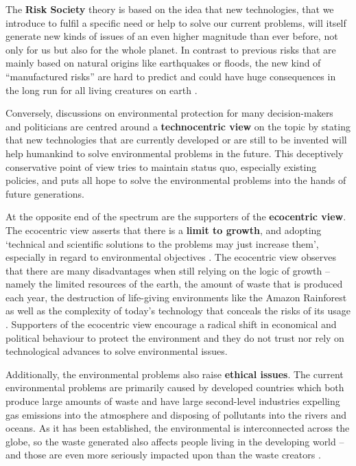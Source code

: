 The \textbf{Risk Society} theory is based on the idea that new technologies, that we introduce to fulfil a specific need or help to solve our current problems, will itself generate new kinds of issues of an even higher magnitude than ever before, not only for us but also for the whole planet. In contrast to previous risks that are mainly based on natural origins like earthquakes or floods, the new kind of ``manufactured risks'' are hard to predict and could have huge consequences in the long run for all living creatures on earth \citep[pg. 53]{Plummer11}.\par\vspace{0.2cm}

Conversely, discussions on environmental protection for many decision-makers and politicians are centred around a \textbf{technocentric view} on the topic by stating that new technologies that are currently developed or are still to be invented will help humankind to solve environmental problems in the future. This deceptively conservative point of view tries to maintain status quo, especially existing policies, and puts all hope to solve the environmental problems into the hands of future generations. \citep[pg. 891]{Plummer11}\par\vspace{0.2cm}

At the opposite end of the spectrum are the supporters of the \textbf{ecocentric view}. The ecocentric view asserts that there is a \textbf{limit to growth}, and adopting `technical and scientific solutions to the problems may just increase them', especially in regard to environmental objectives \citep[p. 891]{Plummer11}. The ecocentric view observes that there are many disadvantages when still relying on the logic of growth -- namely the limited resources of the earth, the amount of waste that is produced each year, the destruction of life-giving environments like the Amazon Rainforest as well as the complexity of today's technology that conceals the risks of its usage \citep[pg. 874]{Plummer11}. Supporters of the ecocentric view encourage a radical shift in economical and political behaviour to protect the environment and they do not trust nor rely on technological advances to solve environmental issues. \citep[pg. 891]{Plummer11}\par\vspace{0.2cm}

Additionally, the environmental problems also raise \textbf{ethical issues}. The current environmental problems are primarily caused by developed countries which both produce large amounts of waste and have large second-level industries expelling gas emissions into the atmosphere and disposing of pollutants into the rivers and oceans. As it has been established, the environmental is interconnected across the globe, so the waste generated also affects people living in the developing world -- and those are even more seriously impacted upon than the waste creators \citep[pg. 870ff]{Plummer11}.\par\vspace{0.2cm}

